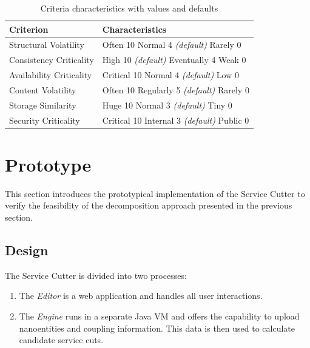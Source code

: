 \begin{table}[H]
	\centering
	\caption{Criteria characteristics with values and defaults}
	\label{tab:characteristics}
	\begin{tabular}{|p{150pt}|p{150pt}|}
		\hline	
		\textbf{Criterion} & \textbf{Characteristics} \\
		\hline
		Structural Volatility & Often 10 \newline Normal 4 \textit{(default)} \newline Rarely 0 \\
		\hline
		Consistency Criticality & High 10 \textit{(default)} \newline Eventually 4 \newline Weak 0 \\
		\hline
		Availability Criticality & Critical 10 \newline Normal 4 \textit{(default)} \newline Low 0 \\
		\hline
		Content Volatility & Often 10 \newline Regularly 5 \textit{(default)} \newline Rarely 0 \\
		\hline
		Storage Similarity & Huge 10 \newline Normal 3 \textit{(default)} \newline Tiny 0 \\
		\hline
		Security Criticality & Critical 10 \newline Internal 3 \textit{(default)} \newline Public 0 \\
		\hline
	\end{tabular}
\end{table}

\section{Prototype} 

This section introduces the prototypical implementation of the Service Cutter to verify the feasibility of the decomposition approach presented in the previous section.

\subsection{Design}

The Service Cutter is divided into two processes:

\begin{enumerate}
	\item The \textit{Editor} is a web application and handles all user interactions.
	\item The \textit{Engine} runs in a separate Java \gls{VM} and offers the capability to upload nanoentities and coupling information. This data is then used to calculate candidate service cuts.
\end{enumerate}

